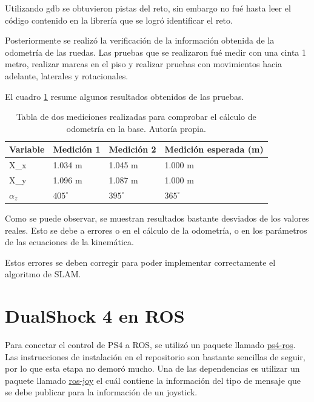 Utilizando gdb se obtuvieron pistas del reto, sin embargo no fué hasta leer el código contenido en la librería que se logró identificar el reto.

Posteriormente se realizó la verificación de la información obtenida de la odometría de las ruedas. Las pruebas que se realizaron fué medir con una cinta 1 metro, realizar marcas en el piso y realizar pruebas con movimientos hacia adelante, laterales y rotacionales.

El cuadro \ref{T:odometria} resume algunos resultados obtenidos de las pruebas.

\begin{table}[H]
\caption{Tabla de dos mediciones realizadas para comprobar el cálculo de odometría en la base. Autoría propia.}
\begin{tabular}{|l|l|l|l|}
\hline
Variable                 & Medición 1                                & Medición 2                                & Medición esperada (m)                     \\ \hline
X\_x                     & 1.034 m                                   & 1.045 m                                   & 1.000 m                                   \\ \hline
X\_y                     & 1.096 m                                   & 1.087 m                                   & 1.000 m                                   \\ \hline
$\alpha_z$ & $405^\circ$ & $395^\circ$ & $365^\circ$ \\ \hline
\end{tabular}
\label{T:odometria}
\end{table}

Como se puede observar, se muestran resultados bastante desviados de los valores reales. Esto se debe a errores o en el cálculo de la odometría, o en los parámetros de las ecuaciones de la kinemática.

Estos errores se deben corregir para poder implementar correctamente el algoritmo de SLAM.

\section{DualShock 4 en ROS}

Para conectar el control de PS4 a ROS, se utilizó un paquete llamado \href{https://github.com/solbach/ps4-ros}{ps4-ros}. Las instrucciones de instalación en el repositorio son bastante sencillas de seguir, por lo que esta etapa no demoró mucho. Una de las dependencias es utilizar un paquete llamado \href{http://wiki.ros.org/joy}{ros-joy} el cuál contiene la información del tipo de mensaje que se debe publicar para la información de un joystick.

